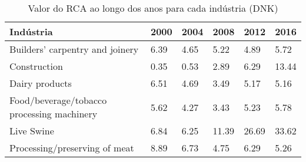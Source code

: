 \begin{table}
\centering
\caption{Valor do RCA ao longo dos anos para cada indústria (DNK)}
\begin{tabular}{p{6cm}p{1.5cm}p{1.5cm}p{1.5cm}p{1.5cm}p{1.5cm}}
\toprule
                                 Indústria & 2000 & 2004 &  2008 &  2012 &  2016 \\
\midrule
           Builders' carpentry and joinery & 6.39 & 4.65 &  5.22 &  4.89 &  5.72 \\
                              Construction & 0.35 & 0.53 &  2.89 &  6.29 & 13.44 \\
                            Dairy products & 6.51 & 4.69 &  3.49 &  5.17 &  5.16 \\
Food/beverage/tobacco processing machinery & 5.62 & 4.27 &  3.43 &  5.23 &  5.78 \\
                                Live Swine & 6.84 & 6.25 & 11.39 & 26.69 & 33.62 \\
             Processing/preserving of meat & 8.89 & 6.73 &  4.75 &  6.29 &  5.26 \\
\bottomrule
\end{tabular}
\end{table}
